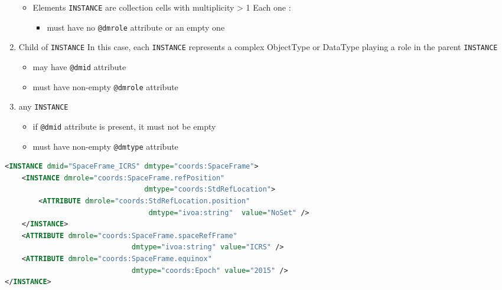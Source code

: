 \begin{enumerate}
\begin{itemize}
     \item Elements \texttt{INSTANCE} are collection cells with multiplicity > 1
          Each one :             
           \begin{itemize}
             \item must have no  \texttt{@dmrole} attribute or an empty one
           \end{itemize}
  \end{itemize}  
    
\item Child of \texttt{INSTANCE}  
     In this case, each \texttt{INSTANCE} represents 
     a complex ObjectType or DataType playing a role in the parent \texttt{INSTANCE}      
     \begin{itemize}
        \item may have  \texttt{@dmid} attribute
        \item must have non-empty  \texttt{@dmrole} attribute
     \end{itemize}
           
\item any \texttt{INSTANCE}      
   \begin{itemize}
        \item if  \texttt{@dmid} attribute is present, it must not be empty
        \item must have non-empty  \texttt{@dmtype} attribute
    \end{itemize}
\end{enumerate}  
    
   
\begin{lstlisting}[caption={Example of \texttt{INSTANCE} child of GLOBALS},language=XML]
<INSTANCE dmid="SpaceFrame_ICRS" dmtype="coords:SpaceFrame">
	<INSTANCE dmrole="coords:SpaceFrame.refPosition"
                                 dmtype="coords:StdRefLocation">
		<ATTRIBUTE dmrole="coords:StdRefLocation.position" 
		                          dmtype="ivoa:string"  value="NoSet" />
	</INSTANCE>
	<ATTRIBUTE dmrole="coords:SpaceFrame.spaceRefFrame" 
	                          dmtype="ivoa:string" value="ICRS" />
	<ATTRIBUTE dmrole="coords:SpaceFrame.equinox" 
	                          dmtype="coords:Epoch"	value="2015" />
</INSTANCE>
\end{lstlisting}   
   

